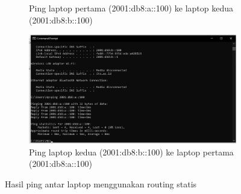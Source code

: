 \begin{enumerate}
\begin{figure}[H]
\begin{subfigure}[b]{0.4\linewidth}
			\caption{Ping laptop pertama (2001:db8:a::100) ke laptop kedua (2001:db8:b::100)\label{fig:konfigurasiR1}}
		\end{subfigure}
		\begin{subfigure}[b]{0.4\linewidth}
			\centering
			\includegraphics[width=\linewidth]{P2/img/router2 laptop2 (4).jpg}
			\caption{Ping laptop kedua (2001:db8:b::100) ke laptop pertama (2001:db8:a::100)\label{fig:konfigurasiR2}}
		\end{subfigure}
		\caption{Hasil ping antar laptop menggunakan routing statis}
		\hspace{1cm}
	\end{figure}
\end{enumerate}
